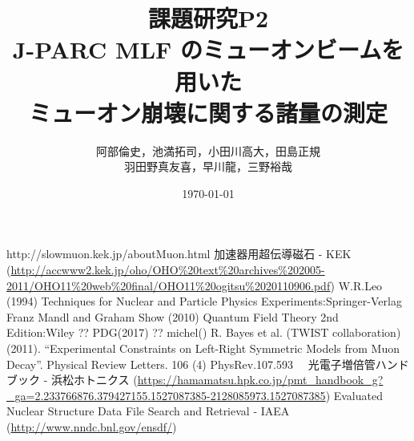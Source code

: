\documentclass[titlepage]{jsarticle}
\begin{document}
\title{課題研究P2\\J-PARC MLF  のミューオンビームを用いた\\ミューオン崩壊に関する諸量の測定}
\author{阿部倫史，池満拓司，小田川高大，田島正規\\羽田野真友喜，早川龍，三野裕哉}
\date{\today}
\maketitle
\tableofcontents
\newpage
%









\newpage
\appendix



\begin{thebibliography}{99} 
 http:\slash\slash{}slowmuon.kek.jp\slash{}aboutMuon.html
 加速器用超伝導磁石 - KEK (\url{http://accwww2.kek.jp/oho/OHO\%20text\%20archives\%202005-2011/OHO11\%20web\%20final/OHO11\%20ogitsu\%2020110906.pdf}) 
 W.R.Leo (1994) Techniques for Nuclear and Particle Physics Experiments:Springer-Verlag
 Franz Mandl and Graham Show (2010) Quantum Field Theory 2nd Edition:Wiley
 ??  PDG(2017)%
 ?? michel() %
 R. Bayes et al. (TWIST collaboration) (2011). ``Experimental Constraints on Left-Right Symmetric Models from Muon Decay''. Physical Review Letters. 106 (4) %
 PhysRev.107.593　%
 光電子増倍管ハンドブック - 浜松ホトニクス (\url{https://hamamatsu.hpk.co.jp/pmt_handbook_g?_ga=2.233766876.379427155.1527087385-2128085973.1527087385})
 Evaluated Nuclear Structure Data File Search and Retrieval - IAEA (\url{http://www.nndc.bnl.gov/ensdf/})
\end{thebibliography} 
\end{document}
